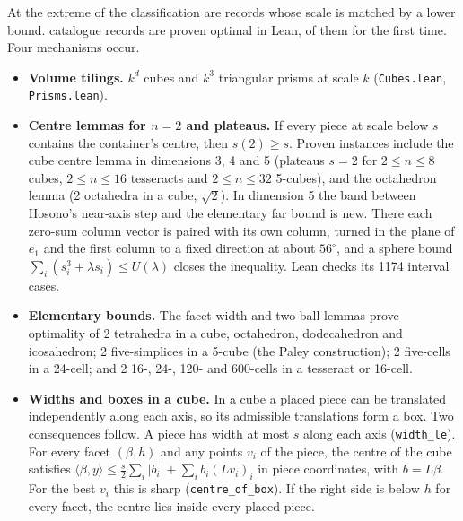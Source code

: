 \documentclass[11pt,a4paper]{article}
\newcommand{\code}[1]{\texttt{\nolinkurl{#1}}}
\newcommand{\lean}[1]{\texttt{#1}}
\theoremstyle{definition}
\theoremstyle{remark}
\begin{document}
At the extreme of the classification are records whose scale is matched by a lower bound. \nProven{} catalogue records are proven optimal in Lean, \nNovel{} of them for the first time. Four mechanisms occur.
\begin{itemize}
\item \textbf{Volume tilings.} $k^d$ cubes and $k^3$ triangular prisms at scale $k$ (\code{Cubes.lean}, \code{Prisms.lean}).
\item \textbf{Centre lemmas for $n=2$ and plateaus.} If every piece at scale below $s$ contains the container's centre, then $s(2)\ge s$. Proven instances include the cube centre lemma in dimensions 3, 4 and 5 (plateaus $s=2$ for $2\le n\le 8$ cubes, $2\le n\le 16$ tesseracts and $2\le n\le 32$ 5-cubes), and the octahedron lemma (2 octahedra in a cube, $\sqrt2$). In dimension 5 the band between Hosono's near-axis step and the elementary far bound is new. There each zero-sum column vector is paired with its own column, turned in the plane of $e_1$ and the first column to a fixed direction at about $56^\circ$, and a sphere bound $\sum_i(s_i^3+\lambda s_i)\le U(\lambda)$ closes the inequality. Lean checks its 1174 interval cases.
\item \textbf{Elementary bounds.} The facet-width and two-ball lemmas prove optimality of 2 tetrahedra in a cube, octahedron, dodecahedron and icosahedron; 2 five-simplices in a 5-cube (the Paley construction); 2 five-cells in a 24-cell; and 2 16-, 24-, 120- and 600-cells in a tesseract or 16-cell.
\item \textbf{Widths and boxes in a cube.} In a cube a placed piece can be translated independently along each axis, so its admissible translations form a box. Two consequences follow. A piece has width at most $s$ along each axis (\lean{width\_le}). For every facet $(\beta,h)$ and any points $v_i$ of the piece, the centre of the cube satisfies $\langle\beta,y\rangle\le \tfrac s2\sum_i|b_i|+\sum_i b_i(Lv_i)_i$ in piece coordinates, with $b=L\beta$. For the best $v_i$ this is sharp (\lean{centre\_of\_box}). If the right side is below $h$ for every facet, the centre lies inside every placed piece.
\end{itemize}
\end{document}
